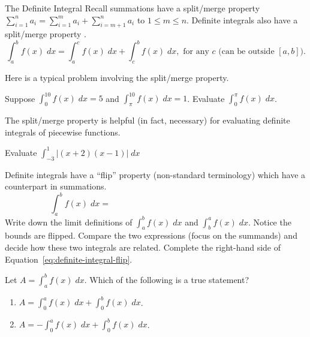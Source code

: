 \documentclass[../main.tex]{subfiles}
\begin{document}
\begin{lesson}{The Definite Integral}
  Recall summations have a split/merge property \(\sum_{i=1}^{n} a_{i} = \sum_{i=1}^{m} a_{i} + \sum_{i=m+1}^{n} a_{i}\)  to \(1 \le m \le n\).
  Definite integrals also have a split/merge property .
  \begin{equation} \label{eq:definite-integral-split}
    \int_{a}^{b} f(x) \;dx = \int_{a}^{c} f(x) \;dx + \int_{c}^{b} f(x) \;dx, \text{ for any } c \text{ (can be outside \([a,b]\)}).
  \end{equation}

  Here is a typical problem involving the split/merge property.
  \begin{example} \label{ex:definite-integral-split}
    Suppose \(\int_{0}^{10} f(x) \;dx = 5\) and \(\int_{\pi}^{10} f(x) \;dx = 1\).  Evaluate \(\int_{0}^{\pi} f(x) \;dx\).
  \end{example}

  The split/merge property is helpful (in fact, necessary) for evaluating definite integrals of piecewise functions.
  \begin{example}
    Evaluate \(\int_{-3}^{1} |(x+2)(x-1)| \;dx \)

  \end{example}
  \vfill{}\clearpage

  Definite integrals have a ``flip'' property (non-standard terminology) which  have a counterpart in summations.
  \begin{equation} \label{eq:definite-integral-flip}
    \int_{a}^{b} f(x) \;dx = \hspace{3in}
  \end{equation}
  Write down the limit definitions of \(\int_{a}^{b} f(x) \;dx\) and \(\int_{b}^{a} f(x) \;dx\). Notice the bounds are flipped.
  Compare the two expressions (focus on the summands) and decide how these two integrals are related. Complete the right-hand side of Equation~\eqref{eq:definite-integral-flip}.

  \begin{example}
    Let \(A = \int_{a}^{b} f(x) \;dx\). Which of the following is a true statement?
    \begin{enumerate}[label=(\alph*)]
      \item \(A = \int_{0}^{a} f(x) \;dx + \int_{0}^{b} f(x) \;dx\).
      \item \(A = - \int_{0}^{a} f(x) \;dx + \int_{0}^{b} f(x) \;dx\).
    \end{enumerate}
    

\end{example}
\end{lesson}
\end{document}
